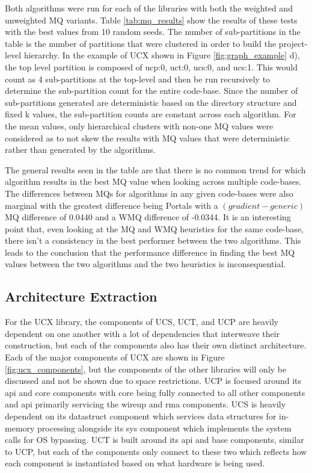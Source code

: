 Both algorithms were run for each of the libraries with both the weighted and unweighted MQ variants. Table \ref{tab:mq_results} show the results of these tests with the best values from 10 random seeds. The number of sub-partitions in the table is the number of partitions that were clustered in order to build the project-level hierarchy. In the example of UCX shown in Figure \ref{fig:graph_example} d), the top level partition is composed of ucp:0, uct:0, ucs:0, and ucs:1. This would count as 4 sub-partitions at the top-level and then be run recursively to determine the sub-partition count for the entire code-base. Since the number of sub-partitions generated are deterministic based on the directory structure and fixed k values, the sub-partition counts are constant across each algorithm. For the mean values, only hierarchical clusters with non-one MQ values were considered as to not skew the results with MQ values that were deterministic rather than generated by the algorithms.

The general results seen in the table are that there is no common trend for which algorithm results in the best MQ value when looking across multiple code-bases. The differences between MQs for algorithms in any given code-bases were also marginal with the greatest difference being Portals with a $(gradient - generic)$ MQ difference of 0.0440 and a WMQ difference of -0.0344. It is an interesting point that, even looking at the MQ and WMQ heuristics for the same code-base, there isn't a consistency in the best performer between the two algorithms. This leads to the conclusion that the performance difference in finding the best MQ values between the two algorithms and the two heuristics is inconsequential. 

\subsection{Architecture Extraction}
\label{subsec:arch_extraction}

For the UCX library, the components of UCS, UCT, and UCP are heavily dependent on one another with a lot of dependencies that interweave their construction, but each of the components also has their own distinct architecture. Each of the major components of UCX are shown in Figure \ref{fig:ucx_components}, but the components of the other libraries will only be discussed and not be shown due to space restrictions. UCP is focused around its api and core components with core being fully connected to all other components and api primarily servicing the wireup and rma components. UCS is heavily dependent on its datastruct component which services data structures for in-memory processing alongside its sys component which implements the system calls for OS bypassing. UCT is built around its api and base components, similar to UCP, but each of the components only connect to these two which reflects how each component is instantiated based on what hardware is being used.

